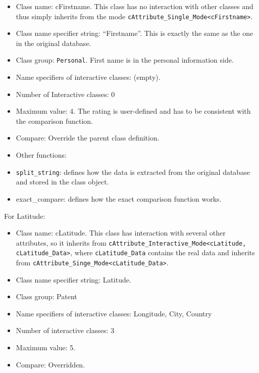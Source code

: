 \documentclass{article}
\begin{document}
\begin{itemize}

\item Class name: cFirstname. This class has no interaction 
with other classes and thus simply inherits from the mode 
\texttt{cAttribute\_Single\_Mode<cFirstname>}.

\item Class name specifier string: “Firstname”. 
This is exactly the same as the one in the original
database.

\item Class group: \texttt{Personal}. First name is in the 
personal information side.

\item Name specifiers of interactive classes: {} (empty).

\item Number of Interactive classes: 0

\item Maximum value: 4. The rating is user-defined and has to
be consistent with the comparison function.

\item Compare: Override the parent class definition.

\item Other functions:

\item \texttt{split\_string}: defines how the data is extracted 
from the original database and stored in the
class object.

\item exact\_compare: defines how the exact
comparison function works.

\end{itemize}

For Latitude:

\begin{itemize}

\item Class name: cLatitude. This class has interaction with several 
other attributes, so it inherits from 
\texttt{cAttribute\_Interactive\_Mode<cLatitude, cLatitude\_Data>},
where \texttt{cLatitude\_Data} contains the real data and inherits 
from \texttt{cAttribute\_Singe\_Mode<cLatitude\_Data>}.

\item Class name specifier string: Latitude.

\item Class group: Patent

\item Name specifiers of interactive classes:
{Longitude, City, Country}

\item Number of interactive classes: 3

\item Maximum value: 5.

\item Compare: Overridden.

\end{itemize}
\end{document}
